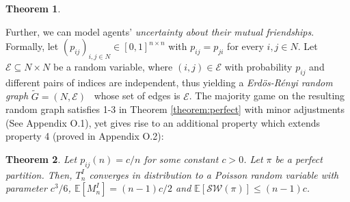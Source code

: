\documentclass[letterpaper]{article} %
\newtheorem{theorem}{Theorem}
\begin{document}
\begin{theorem}
\end{theorem}

Further, we can model agents' \textit{uncertainty about their mutual friendships}. Formally, let $(p_{ij})_{i, j \in N} \in [0,1]^{n \times n}$ with $p_{ij} = p_{ji}$ for every $i, j \in N$. Let $\mathcal{E} \subseteq N \times N$ be a random variable, where $(i,j) \in \mathcal{E}$ with probability $p_{ij}$ and different pairs of indices are independent, thus yielding a \textit{Erd\"{o}s-R\'{e}nyi random graph} $\tilde{G}=(N,\mathcal{E})$~\cite{erdos59random} whose set of edges is $\mathcal{E}$. The majority game on the resulting random graph satisfies 1-3 in Theorem \ref{theorem:perfect} with minor adjustments (See Appendix O.1), yet gives rise to an additional property which extends property 4 (proved in Appendix O.2):%
\begin{theorem}
\label{theorem:perfect-random-graph}
Let $p_{ij}(n) = c/n$ for some constant $c > 0$. Let $\pi$ be a perfect partition. Then, $T_n^I$ converges in distribution to a Poisson random variable with parameter $c^3/6$, $\mathbb{E}[M_n^I] = (n-1) c/2$ and $\mathbb{E}[\mathcal{SW}(\pi)] \leq (n-1) c$.
\end{theorem}
\end{document}
